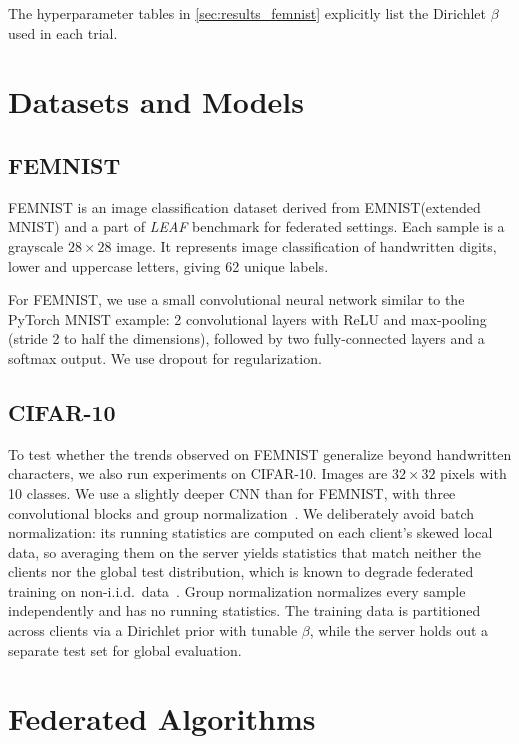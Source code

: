 \documentclass[10pt,twocolumn,letterpaper]{article}
\begin{document}
    The hyperparameter tables in \cref{sec:results_femnist} explicitly list
    the Dirichlet $\beta$ used in each trial.

    \section{Datasets and Models}
    \label{sec:datasets}

    \subsection{FEMNIST}

    FEMNIST is an image classification dataset derived from EMNIST(extended MNIST) and a part of \textit{LEAF} benchmark for federated settings. Each sample is a grayscale $28\times28$ image. It represents image classification of handwritten digits, lower and uppercase letters, giving 62 unique labels.

    For FEMNIST, we use a small convolutional neural network similar to the
    PyTorch MNIST example: 2 convolutional layers with ReLU and max-pooling (stride 2 to half the dimensions), followed by two fully-connected layers and a softmax output. We use dropout for regularization.

    \subsection{CIFAR-10}

    To test whether the trends observed on FEMNIST generalize beyond
    handwritten characters, we also run experiments on CIFAR-10.
    Images are $32\times32$ pixels with 10 classes. We use a slightly deeper CNN than for FEMNIST, with three convolutional blocks and group normalization~\cite{wu2018groupnorm}. We deliberately avoid batch normalization: its running statistics are computed on each client's skewed local data, so averaging them on the server yields statistics that match neither the clients nor the global test distribution, which is known to degrade federated training on non-i.i.d.\ data~\cite{hsieh2020quagmire}. Group normalization normalizes every sample independently and has no running statistics. The training data is partitioned across clients via a Dirichlet prior
    with tunable $\beta$, while the server holds out a separate test set
    for global evaluation.

    \section{Federated Algorithms}
    \label{sec:methods}
\end{document}
